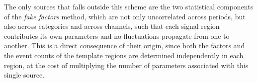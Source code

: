 
The only sources that falls outside this scheme are the two statistical components of the \textit{fake factors} method, which are not only uncorrelated across periods, but also across categories and across channels, such that each signal region contributes its own parameters and no fluctuations propagate from one to another. This is a direct consequence of their origin, since both the factors and the event counts of the template regions are determined independently in each region, at the cost of multiplying the number of parameters associated with this single source.\medskip


